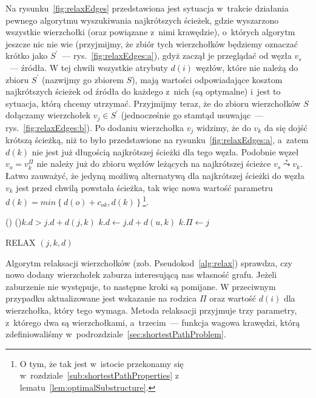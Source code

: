 Na rysunku~\ref{fig:relaxEdges} przedstawiona jest sytuacja w~trakcie działania pewnego algorytmu wyszukiwania najkrótszych ścieżek, gdzie wyszarzono wszystkie wierzchołki (oraz powiązane z~nimi krawędzie), o~których algorytm jeszcze nic nie wie (przyjmijmy, że zbiór tych wierzchołków będziemy oznaczać krótko jako $S^{'}$~--- rys.~\ref{fig:relaxEdges:a}), gdyż zaczął je przeglądać od węzła $v_{s}$~--- źródła.
W tej chwili wszystkie atrybuty $d \left( i \right)$ węzłów, które nie należą do zbioru $S^{'}$ (nazwijmy go zbiorem $S$), mają wartości odpowiadające kosztom najkrótszych ścieżek od źródła do każdego z~nich (są optymalne) i~jest to sytuacja, którą chcemy utrzymać.
Przyjmijmy teraz, że do zbioru wierzchołków $S$ dołączamy wierzchołek $v_{j} \in S^{'}$ (jednocześnie go stamtąd usuwając~--- rys.~\ref{fig:relaxEdges:b}).
Po dodaniu wierzchołka $v_{j}$ widzimy, że do $v_{k}$ da się dojść krótszą ścieżką, niż to było przedstawione na rysunku~\ref{fig:relaxEdges:a}, a~zatem $d \left( k \right)$ nie jest już długością najkrótszej ścieżki dla tego węzła.
Podobnie węzeł $v_{o} = v_{k}^{\Pi}$ nie należy już do zbioru węzłów leżących na najkrótszej ścieżce $v_{s} \overset{*}\leadsto v_{k}$.
Łatwo zauważyć, że jedyną możliwą alternatywą dla najkrótszej ścieżki do węzła $v_{k}$ jest przed chwilą powstała ścieżka, tak więc nowa wartość parametru $d \left( k \right) = min \left\{ d \left( o \right) + c_{ok}, d \left( k \right) \right\}$\footnote{
	O tym, że tak jest w~istocie przekonamy się w~rozdziale~\ref{sub:shortestPathProperties} z lematu~\ref{lem:optimalSubstructure}.
}.

\begin{pseudokod}[!htbp]
	\DontPrintSemicolon
	\Begin(){
		\If(){$ k.d > j.d + d \left( j, k \right)$} {
			$ k.d \longleftarrow j.d + d \left( u, k \right)$ \;
			$ k.\Pi \longleftarrow j$ \;
		}
	}
	\caption{
		RELAX $\left( j, k, d \right)$
	}
	\label{alg:relax}
\end{pseudokod}

Algorytm relaksacji wierzchołków (zob. Pseudokod~\ref{alg:relax}) sprawdza, czy nowo dodany wierzchołek zaburza interesującą nas własność grafu.
Jeżeli zaburzenie nie występuje, to następne kroki są pomijane.
W przeciwnym przypadku aktualizowane jest wskazanie na rodzica $\Pi$ oraz wartość $d \left( i \right)$ dla wierzchołka, który tego wymaga.
Metoda relaksacji przyjmuje trzy parametry, z~którego dwa są wierzchołkami, a~trzecim~--- funkcja wagowa krawędzi, którą zdefiniowaliśmy w~podrozdziale~\ref{sec:shortestPathProblem}.

